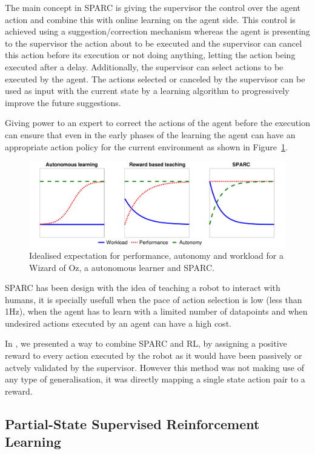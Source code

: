 \documentclass[letterpaper]{article} %
\begin{document}
The main concept in SPARC is giving the supervisor the control over the agent
action and combine this with online learning on the agent side. This control is
achieved using a suggestion/correction mechanism whereas the agent is presenting
to the supervisor the action about to be executed and the supervisor can cancel
this action before its execution or not doing anything, letting the action being
executed after a delay. Additionally, the supervisor can select actions to be
executed by the agent. The actions selected or canceled by the supervisor can be
used as input with the current state by a learning algorithm to progressively
improve the future suggestions.

Giving power to an expert to correct the actions of the agent before the
execution can ensure that even in the early phases of the learning the agent can
have an appropriate action policy for the current environment as shown in Figure~\ref{fig:comparison}.

\begin{figure}
    \centering
    \includegraphics[width=0.9\linewidth]{./fig/motivation.pdf}
    \caption{Idealised expectation for performance, autonomy and workload for a
    Wizard of Oz, a autonomous learner and SPARC.}
    \label{fig:comparison}
\end{figure}

SPARC has been design with the idea of teaching a robot to interact with humans,
it is specially usefull when the pace of action selection is low (less than
1Hz), when the agent has to learn with a limited number of datapoints and when
undesired actions executed by an agent can have a high cost. 

In \cite{senft2017supervised}, we presented a way to combine SPARC and RL, by
assigning a positive reward to every action executed by the robot as it would
have been passively or actvely validated by the supervisor. However this method
was not making use of any type of generalisation, it was directly mapping a
single state action pair to a reward. 

\subsection{Partial-State Supervised Reinforcement Learning}
\end{document}
